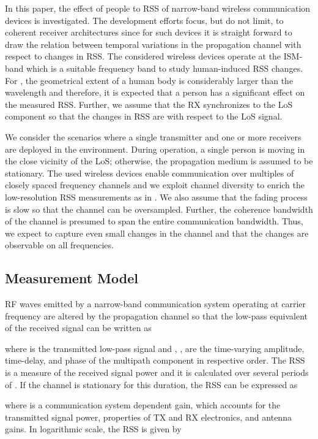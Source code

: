 \documentclass[journal, 10pt, twocolumn, balance]{IEEEtran}
\begin{document}
In this paper, the effect of people to RSS of narrow-band wireless communication devices is investigated. The development efforts focus, but do not limit, to coherent receiver architectures since for such devices it is straight forward to draw the relation between temporal variations in the propagation channel with respect to changes in RSS. The considered wireless devices operate at the  ISM-band which is a suitable frequency band to study human-induced RSS changes. For , the geometrical extent of a human body is considerably larger than the wavelength and therefore, it is expected that a person has a significant effect on the measured RSS. Further, we assume that the RX synchronizes to the LoS component so that the changes in RSS are with respect to the LoS signal.

We consider the scenarios where a single transmitter and one or more receivers are deployed in the environment. During operation, a single person is moving in the close vicinity of the LoS; otherwise, the propagation medium is assumed to be stationary. The used wireless devices enable communication over multiples of closely spaced frequency channels and we exploit channel diversity to enrich the low-resolution RSS measurements as in \cite{Kaltiokallio2012a}. We also assume that the fading process is slow so that the channel can be oversampled. Further, the coherence bandwidth of the channel is presumed to span the entire communication bandwidth. Thus, we expect to capture even small changes in the channel and that the changes are observable on all frequencies.



\subsection{Measurement Model}

RF waves emitted by a narrow-band communication system operating at carrier frequency  are altered by the propagation channel so that the low-pass equivalent of the received signal \cite[Ch. 13]{Proakis2008} can be written as  

where  is the transmitted low-pass signal and , ,  are the time-varying amplitude, time-delay, and phase of the  multipath component in respective order. The RSS is a measure of the received signal power and it is calculated over several periods of . If the channel is stationary for this duration, the RSS can be expressed as
 
where  is a communication system dependent gain, which accounts for the transmitted signal power, properties of TX and RX electronics, and antenna gains. In logarithmic scale, the RSS is given by
\end{document}
